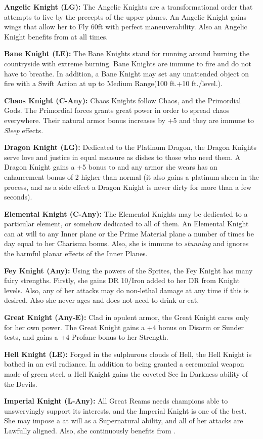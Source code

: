 \begin{itemize*}
\item \textbf{Angelic Knight (LG):} The Angelic Knights are a transformational order that attempts to live by the precepts of the upper planes. An Angelic Knight gains wings that allow her to Fly 60ft with perfect maneuverability. Also an Angelic Knight benefits from  at all times.
\item \textbf{Bane Knight (LE):}  The Bane Knights stand for running around burning the countryside with extreme burning. Bane Knights are immune to fire and do not have to breathe. In addition, a Bane Knight may set any unattended object on fire with a Swift Action at up to Medium Range(100 ft.+10 ft./level.).
\item \textbf{Chaos Knight (C-Any):}  Chaos Knights follow Chaos, and the Primordial Gods. The Primordial forces grants great power in order to spread chaos everywhere. Their natural armor bonus increases by +5 and they are immune to \textit{Sleep} effects.
\item \textbf{Dragon Knight (LG):}  Dedicated to the Platinum Dragon, the Dragon Knights serve love and justice in equal measure as dishes to those who need them. A Dragon Knight gains a +5 bonus to  and any armor she wears has an enhancement bonus of 2 higher than normal (it also gains a platinum sheen in the process, and as a side effect a Dragon Knight is never dirty for more than a few seconds).
\item \textbf{Elemental Knight (C-Any):}  The Elemental Knights may be dedicated to a particular element, or somehow dedicated to all of them. An Elemental Knight can  at will to any Inner plane or the Prime Material plane a number of times be day equal to her Charisma bonus. Also, she is immune to \textit{stunning} and ignores the harmful planar effects of the Inner Planes.
\item \textbf{Fey Knight (Any):}  Using the powers of the Sprites, the Fey Knight has many fairy strengths. Firstly, she gains DR 10/Iron added to her DR from Knight levels. Also, any of her attacks may do non-lethal damage at any time if this is desired. Also she never ages and does not need to drink or eat.
\item \textbf{Great Knight (Any-E):}  Clad in opulent armor, the Great Knight cares only for her own power. The Great Knight gains a +4 bonus on Disarm or Sunder tests, and gains a +4 Profane bonus to her Strength.
\item \textbf{Hell Knight (LE):}  Forged in the sulphurous clouds of Hell, the Hell Knight is bathed in an evil radiance. In addition to being granted a ceremonial weapon made of green steel, a Hell Knight gains the coveted See In Darkness ability of the Devils.
\item \textbf{Imperial Knight (L-Any):}  All Great Reams needs champions able to unswervingly support its interests, and the Imperial Knight is one of the best. She may impose a  at will as a Supernatural ability, and all of her attacks are Lawfully aligned. Also, she continuously benefits from .
\end{itemize*}

